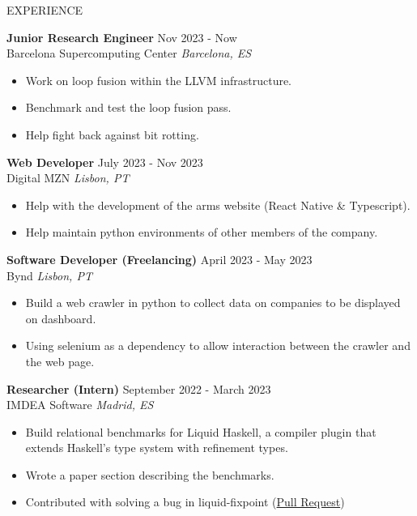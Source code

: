 \documentclass{resume} %
\begin{document}

\begin{rSection}{EXPERIENCE}

  \textbf{Junior Research Engineer} \hfill Nov 2023 - Now\\
  Barcelona Supercomputing Center \hfill \textit{Barcelona, ES}
  \begin{itemize}
    \itemsep -3pt {}
  \item Work on loop fusion within the LLVM infrastructure.
  \item Benchmark and test the loop fusion pass.
  \item Help fight back against bit rotting.
  \end{itemize}
  
  \textbf{Web Developer} \hfill July 2023 - Nov 2023\\
  Digital MZN \hfill \textit{Lisbon, PT}
  \begin{itemize}
    \itemsep -3pt {}
  \item Help with the development of the arms website (React Native \& Typescript).
  \item Help maintain python environments of other members of the company.
  \end{itemize}
  
  \textbf{Software Developer (Freelancing)} \hfill April 2023 - May 2023\\
  Bynd \hfill \textit{Lisbon, PT}
  \begin{itemize}
    \itemsep -3pt {}    
  \item Build a web crawler in python to collect data on companies to
    be displayed on dashboard.
  \item Using selenium as a dependency to allow interaction between the
    crawler and the web page.
  \end{itemize}

  \textbf{Researcher (Intern)} \hfill September 2022 - March 2023\\
  IMDEA Software \hfill \textit{Madrid, ES}
  \begin{itemize}
    \itemsep -3pt {}
  \item Build relational benchmarks for Liquid Haskell, a compiler plugin that extends Haskell’s type system with refinement types.
  \item Wrote a paper section describing the benchmarks.
  \item Contributed with solving a bug in liquid-fixpoint    (\href{https://github.com/ucsd-progsys/liquid-fixpoint/pull/626}{Pull Request})
  \end{itemize}
  

\end{rSection}
\end{document}
